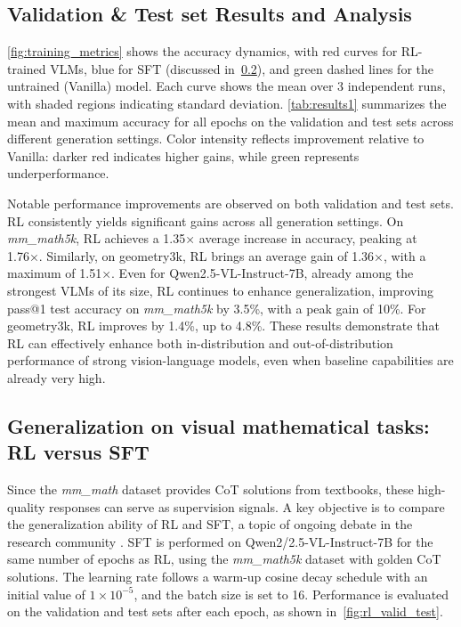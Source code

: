 \documentclass{article} %
\begin{document}
\subsection{Validation \& Test set Results and Analysis}
\cref{fig:training_metrics} shows the accuracy dynamics, with red curves for RL-trained VLMs, blue for SFT (discussed in~\cref{sec:rl_sft_generalization}), and green dashed lines for the untrained (Vanilla) model.
%
Each curve shows the mean over 3 independent runs, with shaded regions indicating standard deviation.
%
\cref{tab:results1} summarizes the mean and maximum accuracy for all epochs on the validation and test sets across different generation settings.
%
Color intensity reflects improvement relative to Vanilla: darker red indicates higher gains, while green represents underperformance.

Notable performance improvements are observed on both validation and test sets. RL consistently yields significant gains across all generation settings.
%
On \textit{mm\_math5k}, RL achieves a 1.35× average increase in accuracy, peaking at 1.76×. Similarly, on geometry3k, RL brings an average gain of 1.36×, with a maximum of 1.51×.
%
Even for Qwen2.5-VL-Instruct-7B, already among the strongest VLMs of its size, RL continues to enhance generalization, improving pass@1 test accuracy on \textit{mm\_math5k} by 3.5\%, with a peak gain of 10\%. For geometry3k, RL improves by 1.4\%, up to 4.8\%.
%
These results demonstrate that RL can effectively enhance both in-distribution and out-of-distribution performance of strong vision-language models, even when baseline capabilities are already very high.

\subsection{Generalization on visual mathematical tasks: RL versus SFT}
\label{sec:rl_sft_generalization}
Since the \textit{mm\_math} dataset \citep{sun2024mmmath} provides CoT solutions from textbooks, these high-quality responses can serve as supervision signals.
%
A key objective is to compare the generalization ability of RL and SFT, a topic of ongoing debate in the research community \citep{chu2025RLgeneral, ye2025limo}.
%
SFT is performed on Qwen2/2.5-VL-Instruct-7B for the same number of epochs as RL, using the \textit{mm\_math5k} dataset with golden CoT solutions.
%
The learning rate follows a warm-up cosine decay schedule with an initial value of $1 \times 10^{-5}$, and the batch size is set to 16.
%
Performance is evaluated on the validation and test sets after each epoch, as shown in~\cref{fig:rl_valid_test}.
\end{document}
